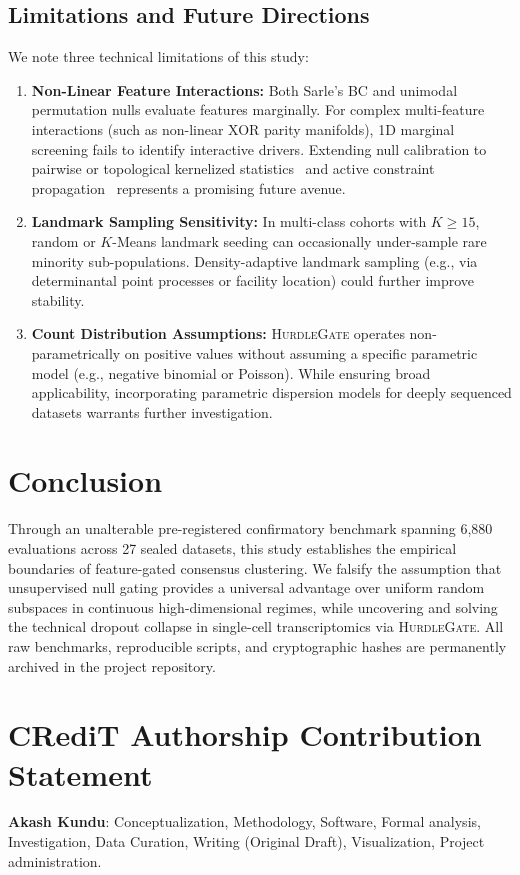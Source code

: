 \documentclass[preprint,12pt]{elsarticle}
\begin{document}
\subsection{Limitations and Future Directions}
We note three technical limitations of this study:
\begin{enumerate}
    \item \textbf{Non-Linear Feature Interactions:} Both Sarle's BC and unimodal permutation nulls evaluate features marginally. For complex multi-feature interactions (such as non-linear XOR parity manifolds), 1D marginal screening fails to identify interactive drivers. Extending null calibration to pairwise or topological kernelized statistics~\cite{xu2026topological} and active constraint propagation~\cite{patron2026codac} represents a promising future avenue.
    \item \textbf{Landmark Sampling Sensitivity:} In multi-class cohorts with $K \ge 15$, random or $K$-Means landmark seeding can occasionally under-sample rare minority sub-populations. Density-adaptive landmark sampling (e.g., via determinantal point processes or facility location) could further improve stability.
    \item \textbf{Count Distribution Assumptions:} \textsc{HurdleGate} operates non-parametrically on positive values without assuming a specific parametric model (e.g., negative binomial or Poisson). While ensuring broad applicability, incorporating parametric dispersion models for deeply sequenced datasets warrants further investigation.
\end{enumerate}

\section{Conclusion}\label{sec:conclusion}

Through an unalterable pre-registered confirmatory benchmark spanning 6,880 evaluations across 27 sealed datasets, this study establishes the empirical boundaries of feature-gated consensus clustering. We falsify the assumption that unsupervised null gating provides a universal advantage over uniform random subspaces in continuous high-dimensional regimes, while uncovering and solving the technical dropout collapse in single-cell transcriptomics via \textsc{HurdleGate}. All raw benchmarks, reproducible scripts, and cryptographic hashes are permanently archived in the project repository.

\section*{CRediT Authorship Contribution Statement}
\textbf{Akash Kundu}: Conceptualization, Methodology, Software, Formal analysis, Investigation, Data Curation, Writing (Original Draft), Visualization, Project administration.
\end{document}
